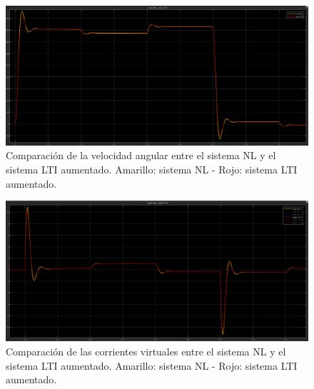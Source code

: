\documentclass{article}
\begin{document}
\begin{figure}[H]
    \centering
    \includegraphics[width=1\textwidth]{Imagenes/ComparativaVelocidadAngular.png}
    \caption{Comparación de la velocidad angular entre el sistema NL y el sistema LTI aumentado. Amarillo: sistema NL - Rojo: sistema LTI aumentado.}
    \label{fig:ComparativaVelocidadAngular}
\end{figure}


\begin{figure}[H]
    \centering
    \includegraphics[width=1\textwidth]{Imagenes/ComparativaCorrientesVirtuales.png}
    \caption{Comparación de las corrientes virtuales entre el sistema NL y el sistema LTI aumentado. Amarillo: sistema NL - Rojo: sistema LTI aumentado.}
    \label{fig:ComparativaCorrientesVirtuales}
\end{figure}
\end{document}
